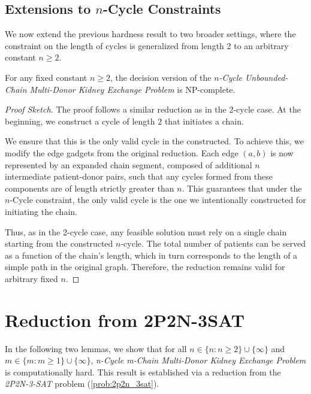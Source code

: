 \subsection{Extensions to $n$-Cycle Constraints}

We now extend the previous hardness result to two broader settings, where the constraint on the length of cycles is generalized from length 2 to an arbitrary constant $n \ge 2$.

\begin{lemma}
For any fixed constant $n \ge 2$, the decision version of the \textit{$n$-Cycle Unbounded-Chain Multi-Donor Kidney Exchange Problem} is NP-complete.
\end{lemma}

\begin{proof}[Proof Sketch]
The proof follows a similar reduction as in the 2-cycle case. At the beginning, we construct a cycle of length $2$ that initiates a chain. 

We ensure that this is the only valid cycle in the constructed. To achieve this, we modify the edge gadgets from the original reduction. Each edge $(a, b)$ is now represented by an expanded chain segment, composed of additional $n$ intermediate patient-donor pairs, such that any cycles formed from these components are of length strictly greater than $n$. This guarantees that under the $n$-Cycle constraint, the only valid cycle is the one we intentionally constructed for initiating the chain.

Thus, as in the 2-cycle case, any feasible solution must rely on a single chain starting from the constructed $n$-cycle. The total number of patients can be served as a function of the chain's length, which in turn corresponds to the length of a simple path in the original graph. Therefore, the reduction remains valid for arbitrary fixed $n$.
\end{proof}



\section{Reduction from 2P2N-3SAT}

In the following two lemmas, we show that for all $n \in \{n : n \ge 2\} \cup \{\infty\}$ and $m \in \{m:m \ge 1\} \cup \{\infty\}$, \textit{n-Cycle m-Chain Multi-Donor Kidney Exchange Problem} is computationally hard. This result is established via a reduction from the \textit{2P2N-3-SAT} problem (\autoref{prob:2p2n_3sat}). 

